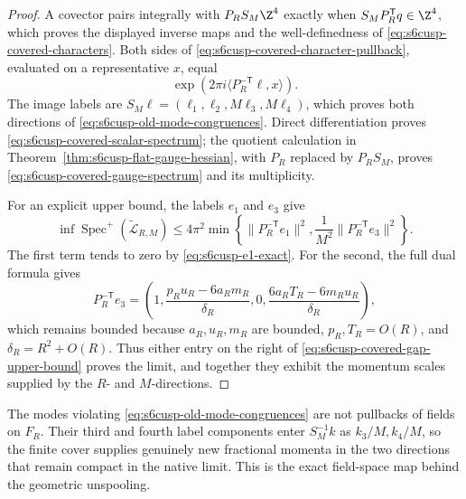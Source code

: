 \begin{proof}
A covector pairs integrally with \(P_RS_M\Z^4\) exactly when
\(S_MP_R^{\mathsf T}q\in\Z^4\), which proves the displayed inverse maps
and the well-definedness of \eqref{eq:s6cusp-covered-characters}.  Both
sides of \eqref{eq:s6cusp-covered-character-pullback}, evaluated on a
representative \(x\), equal
\[
 \exp\left(2\pi i
 \langle P_R^{-\mathsf T}\ell,x\rangle\right).
\]
The image labels are \(S_M\ell=(\ell_1,\ell_2,M\ell_3,M\ell_4)\), which
proves both directions of \eqref{eq:s6cusp-old-mode-congruences}.
Direct differentiation proves
\eqref{eq:s6cusp-covered-scalar-spectrum}; the quotient calculation in
Theorem~\ref{thm:s6cusp-flat-gauge-hessian}, with \(P_R\) replaced by
\(P_RS_M\), proves \eqref{eq:s6cusp-covered-gauge-spectrum} and its
multiplicity.

For an explicit upper bound, the labels \(e_1\) and \(e_3\) give
\begin{equation}\label{eq:s6cusp-covered-gap-upper-bound}
 \inf\operatorname{Spec}^+(\widetilde{\mathcal L}_{R,M})
 \le4\pi^2\min\left\{
 \lVert P_R^{-\mathsf T}e_1\rVert^2,
 \frac1{M^2}\lVert P_R^{-\mathsf T}e_3\rVert^2
 \right\}.
\end{equation}
The first term tends to zero by
\eqref{eq:s6cusp-e1-exact}.  For the second, the full dual formula gives
\begin{equation}\label{eq:s6cusp-third-dual-coordinate}
 P_R^{-\mathsf T}e_3=
 \left(
 1,\frac{p_Ru_R-6a_Rm_R}{\delta_R},0,
 \frac{6a_RT_R-6m_Ru_R}{\delta_R}
 \right),
\end{equation}
which remains bounded because \(a_R,u_R,m_R\) are bounded,
\(p_R,T_R=O(R)\), and \(\delta_R=R^2+O(R)\).
Thus either entry on the right of
\eqref{eq:s6cusp-covered-gap-upper-bound} proves the limit, and together
they exhibit the momentum scales supplied by the \(R\)- and \(M\)-directions.
\end{proof}

The modes violating \eqref{eq:s6cusp-old-mode-congruences} are not pullbacks
of fields on \(F_R\).  Their third and fourth label components enter
\(S_M^{-1}k\) as \(k_3/M,k_4/M\), so the finite cover supplies genuinely
new fractional momenta in the two directions that remain compact in the
native limit.  This is the exact field-space map behind the geometric
unspooling.

